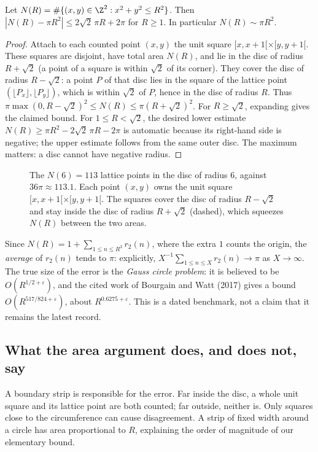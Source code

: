 \begin{theorem}[Gauss]\label{thm:circle}
Let $N(R)=\#\{(x,y)\in\Z^2:x^2+y^2\le R^2\}$. Then $\left|N(R)-\pi R^2\right|\le2\sqrt2\,\pi R+2\pi$ for $R\ge1$. In particular $N(R)\sim\pi R^2$.
\end{theorem}
\begin{proof}
Attach to each counted point $(x,y)$ the unit square $[x,x+1[\times[y,y+1[$. These squares are disjoint, have total area $N(R)$, and lie in the disc of radius $R+\sqrt2$ (a point of a square is within $\sqrt2$ of its corner). They cover the disc of radius $R-\sqrt2$: a point $P$ of that disc lies in the square of the lattice point $(\lfloor P_x\rfloor,\lfloor P_y\rfloor)$, which is within $\sqrt2$ of $P$, hence in the disc of radius $R$. Thus $\pi\max(0,R-\sqrt2)^2\le N(R)\le\pi(R+\sqrt2)^2$. For $R\ge\sqrt2$, expanding gives the claimed bound. For $1\le R<\sqrt2$, the desired lower estimate $N(R)\ge\pi R^2-2\sqrt2\,\pi R-2\pi$ is automatic because its right-hand side is negative; the upper estimate follows from the same outer disc. The maximum matters: a disc cannot have negative radius.
\end{proof}

\begin{figure}[ht]
\centering
{}
\caption{The $N(6)=113$ lattice points in the disc of radius $6$, against $36\pi\approx113.1$. Each point $(x,y)$ owns the unit square $[x,x+1[\times[y,y+1[$. The squares cover the disc of radius $R-\sqrt2$ and stay inside the disc of radius $R+\sqrt2$ (dashed), which squeezes $N(R)$ between the two areas.}
\label{fig:disc}
\end{figure}

Since $N(R)=1+\sum_{1\le n\le R^2}r_2(n)$, where the extra $1$ counts the origin, the \emph{average} of $r_2(n)$ tends to $\pi$: explicitly, $X^{-1}\sum_{1\le n\le X}r_2(n)\to\pi$ as $X\to\infty$. The true size of the error is the \emph{Gauss circle problem}: it is believed to be $O(R^{1/2+\varepsilon})$, and the cited work of Bourgain and Watt (2017) gives a bound $O(R^{517/824+\varepsilon})$, about $R^{0.6275+\varepsilon}$. This is a dated benchmark, not a claim that it remains the latest record.

\subsection*{What the area argument does, and does not, say}
A boundary strip is responsible for the error. Far inside the disc, a whole unit square and its lattice point are both counted; far outside, neither is. Only squares close to the circumference can cause disagreement. A strip of fixed width around a circle has area proportional to $R$, explaining the order of magnitude of our elementary bound.

